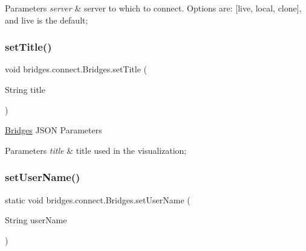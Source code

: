 \begin{DoxyParams}{Parameters}
{\em server} & server to which to connect. Options are\+: \mbox{[}\textquotesingle{}live\textquotesingle{}, \textquotesingle{}local\textquotesingle{}, \textquotesingle{}clone\textquotesingle{}\mbox{]}, and \textquotesingle{}live\textquotesingle{} is the default; \\
\hline
\end{DoxyParams}
\mbox{\label{classbridges_1_1connect_1_1_bridges_aed3752ee6318a48dff271d9a9e2a8fcc}} 
\subsubsection{\texorpdfstring{set\+Title()}{setTitle()}}
{\footnotesize\ttfamily void bridges.\+connect.\+Bridges.\+set\+Title (\begin{DoxyParamCaption}\item[{String}]{title }\end{DoxyParamCaption})}

\mbox{\hyperlink{classbridges_1_1connect_1_1_bridges}{Bridges}} J\+S\+ON Parameters


\begin{DoxyParams}{Parameters}
{\em title} & title used in the visualization; \\
\hline
\end{DoxyParams}
\mbox{\label{classbridges_1_1connect_1_1_bridges_af9b9a2ca03ba02c0c2be4716594678a6}} 
\subsubsection{\texorpdfstring{set\+User\+Name()}{setUserName()}}
{\footnotesize\ttfamily static void bridges.\+connect.\+Bridges.\+set\+User\+Name (\begin{DoxyParamCaption}\item[{String}]{user\+Name }\end{DoxyParamCaption})\hspace{0.3cm}{\ttfamily [static]}}

